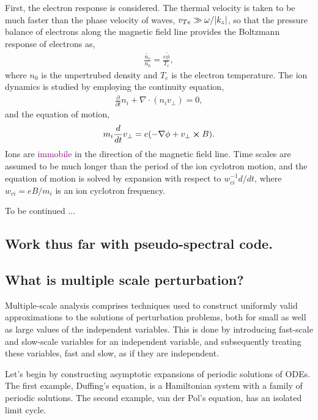 First, the electron response is considered. The thermal velocity is taken to be much faster than the phase velocity of waves, $v_{Te} \gg \omega/\abs{k_z}$, so that the pressure balance of electrons along the magnetic field line provides the Boltzmann response of electrons as, 
\begin{align}
	\frac{\tilde{n_e}}{n_0} = \frac{e \tilde{\phi}}{T_e},
\end{align}
where $n_0$ is the unpertrubed density and $T_e$ is the electron temperature. The ion dynamics is studied by employing the continuity equation, 
\begin{align}
	\frac{\partial }{\partial t} n_i + \nabla \cdot (n_i v_{\perp}) = 0,
\end{align}
and the equation of motion, 
\begin{align}
	m_i \frac{d}{d t} v_{\perp} = e (- \nabla \phi + v_{\perp} \cross B).
\end{align}
Ions are \textcolor{purple}{immobile} in the direction of the magnetic field line. Time scales are assumed to be much longer than the period of the ion cyclotron motion, and the equation of motion is solved by expansion with respect to $w_{ci}^{-1} d/dt$, where $w_{ci} = eB/m_i$ is an ion cyclotron frequency. 

To be continued \cite{diamond_itoh_itoh_2010}...

\subsection{Work thus far with pseudo-spectral code.}

\subsection{What is multiple scale perturbation?}
Multiple-scale analysis comprises techniques used to construct uniformly valid approximations to the solutions of perturbation problems, both for small as well as large values of the independent variables. This is done by introducing fast-scale and slow-scale variables for an independent variable, and subsequently treating these variables, fast and slow, as if they are independent.

Let's begin by constructing asymptotic expansions of periodic solutions of ODEs. The first example, Duffing's equation, is a Hamiltonian system with a family of periodic solutions. The second example, van der Pol's equation, has an isolated limit cycle. 

